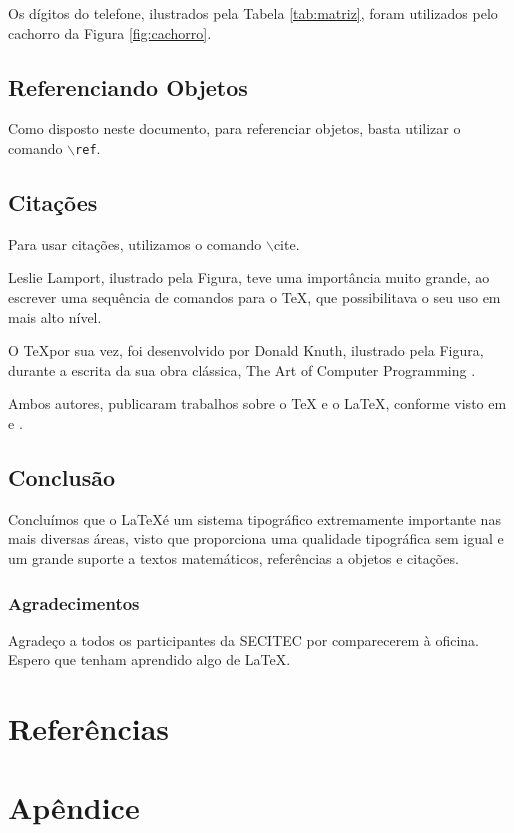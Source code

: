 \documentclass{book}
\begin{document}
Os dígitos do telefone, ilustrados pela Tabela \ref{tab:matriz}, foram utilizados pelo cachorro da Figura
\ref{fig:cachorro}.

\section{Referenciando Objetos}
Como disposto neste documento, para referenciar objetos, basta utilizar o comando {\tt $\backslash$ref}.
\section{Citações}
Para usar citações, utilizamos o comando {$\backslash$cite}.

Leslie Lamport, ilustrado pela Figura, teve uma importância muito grande, ao escrever uma sequência de comandos para o \TeX, que possibilitava o seu uso em mais alto nível.

O \TeX por sua vez, foi desenvolvido por Donald Knuth, ilustrado pela Figura,  durante a escrita da sua obra clássica, The Art of Computer Programming \cite{Knuth81}.

Ambos autores, publicaram trabalhos sobre o \TeX{} e o \LaTeX, conforme visto em \cite{knuth1979tex} e \cite{lamport1986document}.

\section{Conclusão}
Concluímos que o \LaTeX é um sistema tipográfico extremamente importante nas mais diversas áreas, visto que proporciona uma qualidade tipográfica sem igual e um grande suporte a textos matemáticos, referências a objetos e citações.
\subsection{Agradecimentos}
Agradeço a todos os participantes da SECITEC por comparecerem à oficina. Espero que tenham aprendido algo de \LaTeX.

\chapter{Referências}



\chapter{Apêndice}
\lipsum[1-8]
\end{document}
